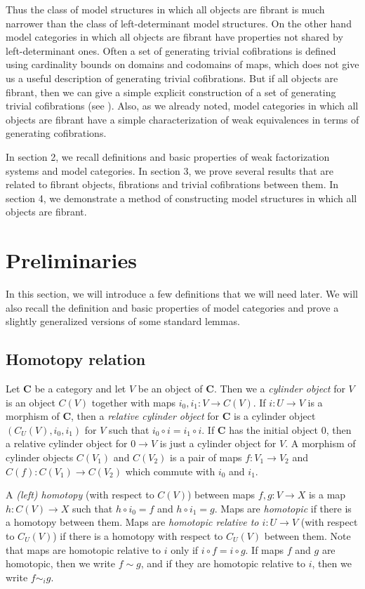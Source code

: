 \documentclass{tac}
\theoremstyle{definition}
\newcommand{\cat}[1]{\mathbf{#1}}
\newcommand{\C}{\cat{C}}
\newcommand{\cyli}{i}
\begin{document}
Thus the class of model structures in which all objects are fibrant is much narrower than the class of left-determinant model structures.
On the other hand model categories in which all objects are fibrant have properties not shared by left-determinant ones.
Often a set of generating trivial cofibrations is defined using cardinality bounds on domains and codomains of maps,
which does not give us a useful description of generating trivial cofibrations.
But if all objects are fibrant, then we can give a simple explicit construction of a set of generating trivial cofibrations (see ).
Also, as we already noted, model categories in which all objects are fibrant have a simple characterization of weak equivalences in terms of generating cofibrations.

In section 2, we recall definitions and basic properties of weak factorization systems and model categories.
In section 3, we prove several results that are related to fibrant objects, fibrations and trivial cofibrations between them.
In section 4, we demonstrate a method of constructing model structures in which all objects are fibrant.

\section{Preliminaries}

In this section, we will introduce a few definitions that we will need later.
We will also recall the definition and basic properties of model categories and prove a slightly generalized versions of some standard lemmas.

\subsection{Homotopy relation}

Let $\C$ be a category and let $V$ be an object of $\C$.
Then we a \emph{cylinder object} for $V$ is an object $C(V)$ together with maps $\cyli_0,\cyli_1 : V \to C(V)$.
If $i : U \to V$ is a morphism of $\C$, then a \emph{relative cylinder object} for $\C$
is a cylinder object $(C_U(V),\cyli_0,\cyli_1)$ for $V$ such that $\cyli_0 \circ i = \cyli_1 \circ i$.
If $\C$ has the initial object $0$, then a relative cylinder object for $0 \to V$ is just a cylinder object for $V$.
A morphism of cylinder objects $C(V_1)$ and $C(V_2)$ is a pair of maps $f : V_1 \to V_2$ and $C(f) : C(V_1) \to C(V_2)$ which commute with $\cyli_0$ and $\cyli_1$.

A \emph{(left) homotopy} (with respect to $C(V)$) between maps $f,g : V \to X$ is a map $h : C(V) \to X$ such that $h \circ \cyli_0 = f$ and $h \circ \cyli_1 = g$.
Maps are \emph{homotopic} if there is a homotopy between them.
Maps are \emph{homotopic relative to $i : U \to V$} (with respect to $C_U(V)$) if there is a homotopy with respect to $C_U(V)$ between them.
Note that maps are homotopic relative to $i$ only if $i \circ f = i \circ g$.
If maps $f$ and $g$ are homotopic, then we write $f \sim g$, and if they are homotopic relative to $i$, then we write $f \sim_i g$.
\end{document}

